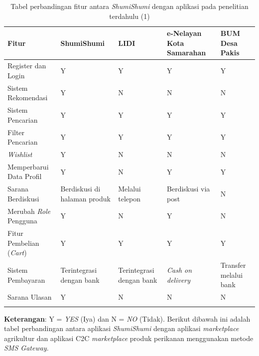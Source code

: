 \documentclass[a4paper]{article}
\begin{document}
\begin{longtable}{|p{3cm}|p{2cm}|p{2cm}|p{3cm}|p{2cm}|}
    \hline
    Fitur & ShumiShumi & LIDI & e-Nelayan Kota Samarahan & BUM Desa Pakis\\
    \hline
    Register dan Login & Y & Y & Y & Y\\
    \hline
    Sistem Rekomendasi & Y & N & N & N\\
    \hline
    Sistem Pencarian & Y & Y & Y & Y\\
    \hline
    Filter Pencarian & Y & Y & Y & Y\\
    \hline
    \textit{Wishlist} & Y & N & N & N\\
    \hline
    Memperbarui Data Profil & Y & N & Y & Y\\
    \hline
    Sarana Berdiskusi & Berdiskusi di halaman produk & Melalui telepon & Berdiskusi via post & N\\
    \hline
    Merubah \textit{Role} Pengguna & Y & N & Y & N\\
    \hline
    Fitur Pembelian (\textit{Cart}) & Y & Y & Y & Y\\
    \hline
    Sistem Pembayaran & Terintegrasi dengan bank & Terintegrasi dengan bank & \textit{Cash on delivery} & Transfer melalui bank\\
    \hline
    Sarana Ulasan & Y & N & N & N\\
    \hline
    \caption{Tabel perbandingan fitur antara \textit{ShumiShumi} dengan aplikasi pada penelitian terdahulu (1)}
\end{longtable}

\textbf{Keterangan}: Y = \textit{YES} (Iya) dan N = \textit{NO} (Tidak).
\newpage
Berikut dibawah ini adalah tabel perbandingan antara aplikasi \textit{ShumiShumi} dengan aplikasi \textit{marketplace} agrikultur\autocite{agriculture-marketplace} dan aplikasi C2C \textit{marketplace} produk perikanan menggunakan metode \textit{SMS Gateway}\autocite{c2c-fish-marketplace}.
\end{document}
